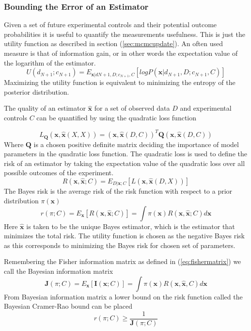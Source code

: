 \subsubsection{Bounding the Error of an Estimator}
Given a set of future experimental controls and their potential outcome probabilities it is useful to quantify the measurements usefulness. This is just the utility function as described in section (\ref{sec:mcmcupdate}). An often used measure is that of information gain, or in other words the expectation value of the logarithm of the estimator. 
\begin{equation}
U(d_{N+1};c_{N+1}) = E_{\mathbf{x}|d{N+1},D;c_{N+1},C}[log P(\mathbf{x}|d_{N+1},D;c_{N+1},C)]
\label{eq:utilityfunction}
\end{equation}
Maximizing the utility function is equivalent to minimizing the entropy of the posterior distribution.

The quality of an estimator $\mathbf{\hat{x}}$ for a set of observed data $D$ and experimental controls $C$ can be quantified by using the quadratic loss function 

\begin{equation}
L_{\mathbf{Q}}(\mathbf{x},\mathbf{\hat{x}}(X,X)) = (\mathbf{x},\mathbf{\hat{x}}(D,C))^T\mathbf{Q}(\mathbf{x},\mathbf{\hat{x}}(D,C))
\label{eq:quadraticloss}
\end{equation}
Where $\mathbf{Q}$ is a chosen positive definite matrix deciding the importance of model parameters in the quadratic loss function. The quadratic loss is used to define the risk of an estimator by taking the expectation value of the quadratic loss over all possible outcomes of the experiment.
\begin{equation}
R(\mathbf{x},\mathbf{\hat{x}};C) = E_{D|\mathbf{x};C}[L(\mathbf{x},\mathbf{\hat{x}}(D,X))]
\label{eq:risk}
\end{equation}
The Bayes risk is the average risk of the risk function with respect to a prior distribution $\pi(\mathbf{x})$
\begin{equation}
r(\pi;C) = E_\mathbf{x}[R(\mathbf{x},\mathbf{\hat{x}};C)] = \int \pi(\mathbf{x})R(\mathbf{x},\mathbf{\hat{x}};C)d\mathbf{x}
\label{eq:bayesrisk}
\end{equation}
Here $\mathbf{\hat{x}}$ is taken to be the unique Bayes estimator, which is the estimator that minimizes the total risk. The utility function is chosen as the negative Bayes risk as this corresponds to minimizing the Bayes risk for chosen set of parameters. 
 
Remembering the Fisher information matrix as defined in (\ref{eq:fishermatrix}) we call the Bayesian information matrix\cite{bayesiancramer}
\begin{equation}
\mathbf{J}(\pi;C) = E_\mathbf{x}[\mathbf{I}(\mathbf{x};C)] = \int \pi(\mathbf{x})R(\mathbf{x},\mathbf{\hat{x}},C)d\mathbf{x}
\label{eq:bayesianinformation}
\end{equation}
From Bayesian information matrix a lower bound on the risk function called the Bayesian Cramer-Rao bound can be placed \cite{bcrb}
\begin{equation}
\label{eq:bayeslowerbound}
r(\pi;C)\geq \frac{1}{\mathbf{J}(\pi;C)}
\end{equation}


